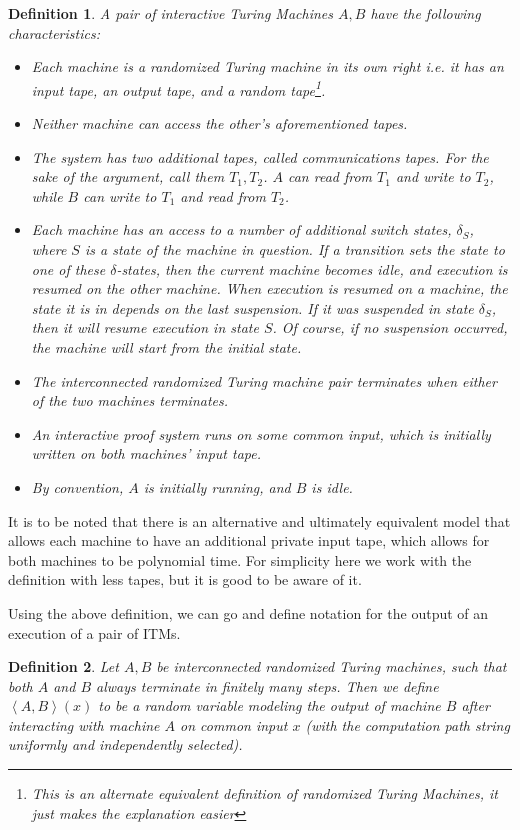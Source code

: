 \documentclass{article}
\newtheorem{definition}{Definition}
\begin{document}
\begin{definition}
    A pair of interactive Turing Machines $A, B$ have the following characteristics:
    \begin{itemize}
        \item Each machine is a randomized Turing machine in its own right i.e. it has an input tape, an output tape, and a random tape\footnote{This is an alternate equivalent definition of randomized Turing Machines, it just makes the explanation easier}.
        \item Neither machine can access the other's aforementioned tapes.
        \item The system has two additional tapes, called communications tapes. For the sake of the argument, call them $T_1, T_2$. $A$ can read from $T_1$ and write to $T_2$, while $B$ can write to $T_1$ and read from $T_2$.
        \item Each machine has an access to a number of additional switch states, $\delta_S$, where $S$ is a state of the machine in question. If a transition sets the state to one of these $\delta$-states, then the current machine becomes idle, and execution is resumed on the other machine. When execution is resumed on a machine, the state it is in depends on the last suspension. If it was suspended in state $\delta_S$, then it will resume execution in state $S$. Of course, if no suspension occurred, the machine will start from the initial state.
        \item The interconnected randomized Turing machine pair terminates when either of the two machines terminates.
        \item An interactive proof system runs on some common input, which is initially written on both machines' input tape.
        \item By convention, $A$ is initially running, and $B$ is idle.
    \end{itemize}
\end{definition}

It is to be noted that there is an alternative and ultimately equivalent model that allows each machine to have an additional private input tape, which allows for both machines to be polynomial time. For simplicity here we work with the definition with less tapes, but it is good to be aware of it.

Using the above definition, we can go and define notation for the output of an execution of a pair of ITMs.

\begin{definition}
    Let $A, B$ be interconnected randomized Turing machines, such that both $A$ and $B$ always terminate in finitely many steps. Then we define $\left<A, B \right>(x)$ to be a random variable modeling the output of machine $B$ after interacting with machine $A$ on common input $x$ (with the computation path string uniformly and independently selected).
\end{definition}
\end{document}

